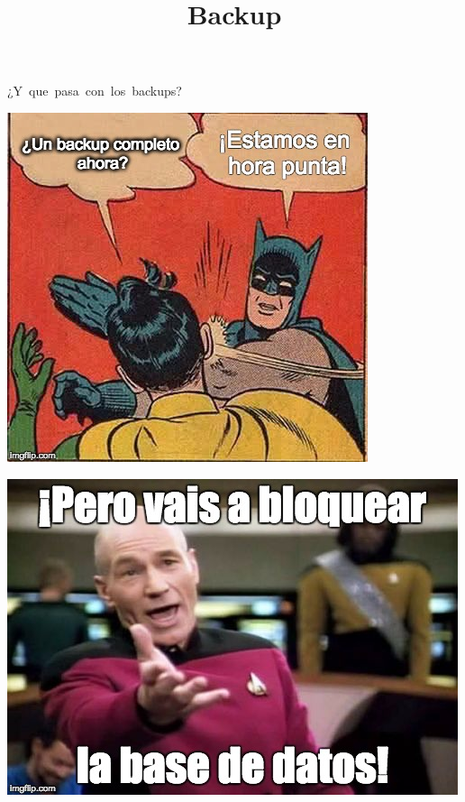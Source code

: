 \documentclass[UTF8]{beamer}
\begin{document}
\title[Backup]{Backup}

\begin{frame}
	\centering
	\mbox{¿Y que pasa con los backups?}	
\end{frame}

\begin{frame}
	\centering
	\includegraphics[width=\textwidth,height=\textheight,keepaspectratio]{necesitas_backup}
\end{frame}

\begin{frame}
	\includegraphics[width=\textwidth,height=\textheight,keepaspectratio]{bloquear}
\end{frame}
\end{document}
